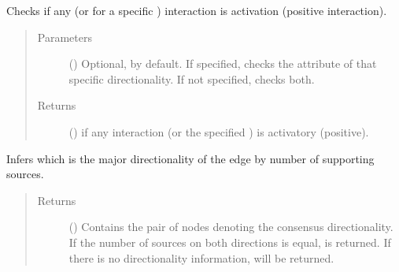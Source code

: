 \documentclass[letterpaper,10pt,english]{sphinxmanual}
\begin{document}
\begin{fulllineitems}
\begin{fulllineitems}
\label{\detokenize{reference:pypath.main.Direction.is_stimulation}}
Checks if any (or for a specific ) interaction is
activation (positive interaction).
\begin{quote}\begin{description}
\item[{Parameters}] \leavevmode
{} () \textendash{} Optional,  by default. If specified, checks the
 attribute of that specific
directionality. If not specified, checks both.

\item[{Returns}] \leavevmode
() \textendash{}  if any interaction (or the specified
) is activatory (positive).

\end{description}\end{quote}

\end{fulllineitems}


\begin{fulllineitems}
\label{\detokenize{reference:pypath.main.Direction.majority_dir}}
Infers which is the major directionality of the edge by number
of supporting sources.
\begin{quote}\begin{description}
\item[{Returns}] \leavevmode
() \textendash{} Contains the pair of nodes denoting the
consensus directionality. If the number of sources on both
directions is equal,  is returned. If there is no
directionality information,  will be
returned.

\end{description}\end{quote}

\end{fulllineitems}


\end{fulllineitems}
\end{document}
